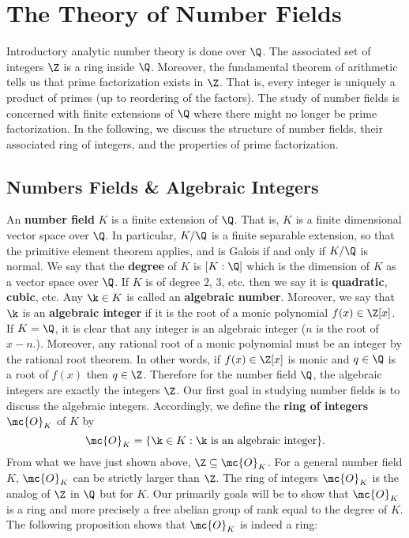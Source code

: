 \chapter{The Theory of Number Fields}
  Introductory analytic number theory is done over $\Q$. The associated set of integers $\Z$ is a ring inside $\Q$. Moreover, the fundamental theorem of arithmetic tells us that prime factorization exists in $\Z$. That is, every integer is uniquely a product of primes (up to reordering of the factors). The study of number fields is concerned with finite extensions of $\Q$ where there might no longer be prime factorization. In the following, we discuss the structure of number fields, their associated ring of integers, and the properties of prime factorization.
  \section{Numbers Fields \& Algebraic Integers}
    An \textbf{number field} $K$ is a finite extension of $\Q$. That is, $K$ is a finite dimensional vector space over $\Q$. In particular, $K/\Q$ is a finite separable extension, so that the primitive element theorem applies, and is Galois if and only if $K/\Q$ is normal. We say that the \textbf{degree} of $K$ is $[K:\Q]$ which is the dimension of $K$ as a vector space over $\Q$. If $K$ is of degree $2$, $3$, etc. then we say it is \textbf{quadratic}, \textbf{cubic}, etc. Any $\k \in K$ is called an \textbf{algebraic number}. Moreover, we say that $\k$ is an \textbf{algebraic integer} if it is the root of a monic polynomial $f(x) \in \Z[x]$. If $K = \Q$, it is clear that any integer is an algebraic integer ($n$ is the root of $x-n$.). Moreover, any rational root of a monic polynomial must be an integer by the rational root theorem. In other words, if $f(x) \in \Z[x]$ is monic and $q \in \Q$ is a root of $f(x)$ then $q \in \Z$. Therefore for the number field $\Q$, the algebraic integers are exactly the integers $\Z$. Our first goal in studying number fields is to discuss the algebraic integers. Accordingly, we define the \textbf{ring of integers} $\mc{O}_{K}$ of $K$ by
    \[
      \mc{O}_{K} = \{\k \in K:\text{$\k$ is an algebraic integer}\}.
    \]
    From what we have just shown above, $\Z \subseteq \mc{O}_{K}$. For a general number field $K$, $\mc{O}_{K}$ can be strictly larger than $\Z$. The ring of integers $\mc{O}_{K}$ is the analog of $\Z$ in $\Q$ but for $K$. Our primarily goals will be to show that $\mc{O}_{K}$ is a ring and more precisely a free abelian group of rank equal to the degree of $K$. The following proposition shows that $\mc{O}_{K}$ is indeed a ring:


